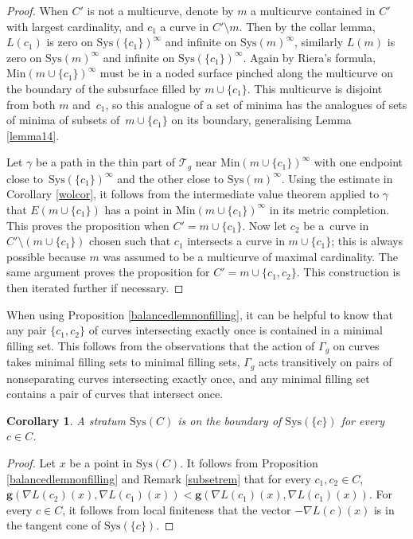 \documentclass[pdftex]{sigma}
\numberwithin{equation}{section}
\newtheorem{Corollary}[Theorem]{Corollary}
\begin{document}
\begin{proof}
When $C'$ is not a multicurve, denote by $m$ a multicurve contained in $C'$ with largest cardinality, and $c_{1}$ a curve in $C'\setminus m$. Then by the collar lemma, $L(c_{1})$ is zero on $\mathrm{Sys}(\{c_{1}\})^{\infty}$ and infinite on $\mathrm{Sys}(m)^{\infty}$, similarly $L(m)$ is zero on $\mathrm{Sys}(m)^{\infty}$ and infinite on $\mathrm{Sys}(\{c_{1}\})^{\infty}$. Again by Riera's formula, $\mathrm{Min}(m\cup\{c_{1}\})^{\infty}$ must be in a noded surface pinched along the multicurve on the boundary of the subsurface filled by $m\cup\{c_{1}\}$. This multicurve is disjoint from both $m$ and~$c_{1}$, so this analogue of a set of minima has the analogues of sets of minima of subsets of~${m\cup\{c_{1}\}}$ on its boundary, generalising Lemma \ref{lemma14}.

Let $\gamma$ be a path in the thin part of $\mathcal{T}_{g}$ near $\mathrm{Min}(m\cup\{c_{1}\})^{\infty}$ with one endpoint close to~$\mathrm{Sys}(\{c_{1}\})^{\infty}$ and the other close to $\mathrm{Sys}(m)^{\infty}$. Using the estimate in Corollary \ref{wolcor}, it follows from the intermediate value theorem applied to $\gamma$ that $E(m\cup\{c_{1}\})$ has a point in $\mathrm{Min}(m\cup\{c_{1}\})^{\infty}$ in its metric completion. This proves the proposition when $C'=m\cup \{c_{1}\}$. Now let $c_{2}$ be a~curve in $C'\setminus (m\cup \{c_{1}\})$ chosen such that $c_{1}$ intersects a curve in $m\cup \{c_{1}\}$; this is always possible because $m$ was assumed to be a multicurve of maximal cardinality. The same argument proves the proposition for $C'=m\cup \{c_{1},c_{2}\}$. This construction is then iterated further if necessary.
\end{proof}

\begin{Remark}
\label{subsetrem}
When using Proposition \ref{balancedlemnonfilling}, it can be helpful to know that any pair $\{c_{1}, c_{2}\}$ of curves intersecting exactly once is contained in a minimal filling set. This follows from the observations that the action of $\Gamma_{g}$ on curves takes minimal filling sets to minimal filling sets, $\Gamma_{g}$ acts transitively on pairs of nonseparating curves intersecting exactly once, and any minimal filling set contains a pair of curves that intersect once.
\end{Remark}

\begin{Corollary}
\label{polytopecor}
A stratum $\mathrm{Sys}(C)$ is on the boundary of $\mathrm{Sys}(\{c\})$ for every $c\in C$.
\end{Corollary}
\begin{proof}
Let $x$ be a point in $\mathrm{Sys}(C)$. It follows from Proposition \ref{balancedlemnonfilling} and Remark \ref{subsetrem} that for every $c_{1}, c_{2}\in C$, $\mathbf{g}(\nabla L(c_{2})(x),\nabla L(c_{1})(x))<\mathbf{g}(\nabla L(c_{1})(x), \nabla L(c_{1})(x))$. For every $c\in C$, it follows from local finiteness that the vector $-\nabla L(c)(x)$ is in the tangent cone of $\mathrm{Sys}(\{c\})$.
\end{proof}
\end{document}

